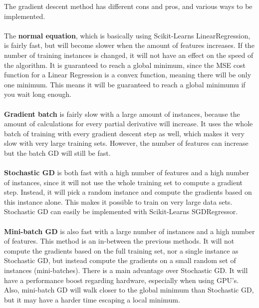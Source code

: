 \documentclass{article}
\begin{document}
The gradient descent method has different cons and pros, and various ways to be implemented.
\\ \\
The \textbf{normal equation}, which is basically using Scikit-Learns LinearRegression, is fairly fast, but will become slower when the amount of features increases. If the number of training instances is changed, it will not have an effect on the speed of the algorithm. It is guaranteed to reach a global minimum, since the MSE cost function for a Linear Regression is a convex function, meaning there will be only one minimum. This means it will be guaranteed to reach a global minimumu if you wait long enough.
\\ \\
\textbf{Gradient batch} is fairly slow with a large amount of instances, because the amount of calculations for every partial derivative will increase. It uses the whole batch of training with every gradient descent step as well, which makes it very slow with very large training sets. However, the number of features can increase but the batch GD will still be fast.
\\ \\
\textbf{Stochastic GD} is both fast with a high number of features and a high number of instances, since it will not use the whole training set to compute a gradient step. Instead, it will pick a random instance and compute the gradients based on this instance alone. This makes it possible to train on very large data sets. Stochastic GD can easily be implemented with Scikit-Learns SGDRegressor.
\\ \\
\textbf{Mini-batch GD} is also fast with a large number of instances and a high number of features. This method is an in-between the previous methods. It will not compute the gradients based on the full training set, nor a single instance as Stochastic GD, but instead compute the gradients on a small random set of instances (mini-batches). There is a main advantage over Stochastic GD. It will have a performance boost regarding hardware, especially when using GPU's. Also, mini-batch GD will walk closer to the global minimum than Stochastic GD, but it may have a harder time escaping a local minimum. 
\end{document}
